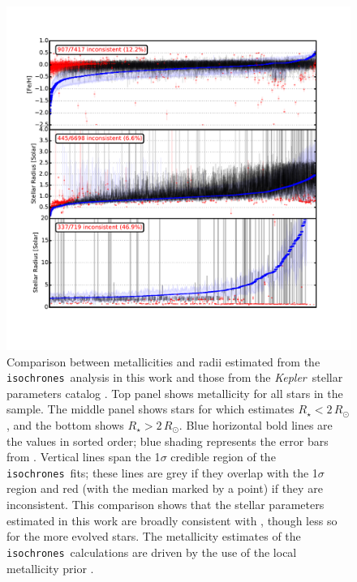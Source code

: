 \documentclass{emulateapj}
\newcommand{\kepler}{\textit{Kepler}}
\newcommand{\isochrones}{\texttt{isochrones}}
\begin{document}
\begin{figure}[p]
\begin{center}
\includegraphics[width=7in]{figures/hubercompare_fehradius.pdf}
\end{center}
\caption{Comparison between metallicities and radii estimated from the
  \isochrones\ analysis in this work and those from the
  \kepler\ stellar parameters catalog \citep[][hereafter
    ]{Huber:2014}.  Top panel shows metallicity
  for all stars in the sample.  The middle panel shows stars for which
   estimates $R_\star < 2\,R_\odot$, and the
  bottom shows $R_\star > 2\,R_\odot$. Blue horizontal bold lines are
  the  values in sorted order; blue shading
  represents the error bars from .  Vertical
  lines span the 1$\sigma$ credible region of the \isochrones\ fits;
  these lines are grey if they overlap with the
   1$\sigma$ region and red (with the median
  marked by a point) if they are inconsistent.  This comparison shows
  that the stellar parameters estimated in this work are broadly
  consistent with , though less so for the more
  evolved stars.  The metallicity estimates of the
  \isochrones\ calculations are driven by the use of the local
  metallicity prior \citep[][\autoref{table:priors}]{Hayden:2015,
    Casagrande:2011}.
\label{fig:starsfehradius}}
\end{figure}
\end{document}
